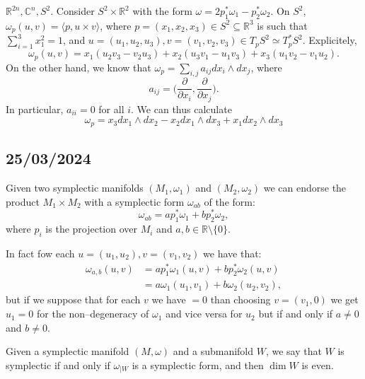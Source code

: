 \documentclass[misc]{subfiles}
\begin{document}
\begin{Exp}
    $\mathbb{R}^{2n}, \mathbb{C}^n, S^2$. Consider $S^2\times \mathbb{R}^2$ with the form $\omega = 2p_1^\ast\omega_1 - p_2^\ast\omega_2$. On $S^2$, $\omega_p(u,v) = \langle p, u\times v \rangle$, where $p=(x_1,x_2,x_3)\in S^2\subseteq \mathbb{R}^3$ is such that $\sum_{i=1}^3 x_1^2 = 1$, and $u=(u_1,u_2,u_3),v=(v_1,v_2,v_3)\in T_pS^2\simeq T_p^\ast S^2$. Explicitely,
    \[
    \omega_p(u,v) = x_1(u_2v_3 - v_2u_3) + x_2(u_3v_1 - u_1v_3) + x_3(u_1v_2 - v_1u_2).
    \] 
    On the other hand, we know that $\omega_p = \sum_{i,j} a_{ij} dx_i\wedge dx_j$, where
    \[
    a_{ij} = \bigg( \frac{\partial}{\partial x_i}, \frac{\partial}{\partial x_j}\bigg).
    \] 
    In particular, $a_{ii}=0$ for all $i$. We can thus calculate
    \[
    \omega_p = x_3dx_1\wedge dx_2 - x_2dx_1\wedge dx_3 + x_1dx_2\wedge dx_3 
    \] 
\end{Exp}


\subsection*{25/03/2024}

\begin{Rmk}
    Given two symplectic manifolds $(M_1,\omega_1)$ and $(M_2,\omega_2)$ we can endorse the product $M_1 \times M_2$ with a symplectic form $\omega_{ab}$ of the form:
    \[
    \omega_{ab}=ap^\ast_1\omega_1+bp^\ast_2\omega_2,
    \]
    where $p_i$ is the projection over $M_i$ and $a,b \in \mathbb{R} \setminus \{0\}$.

    In fact fow each $u=(u_1,u_2), v=(v_1,v_2)$ we have that:
    \begin{align*}
        \omega_{a,b}(u,v)   &= ap_1^\ast\omega_1(u,v) + bp_2^\ast\omega_2(u,v) \\
                            &= a\omega_1(u_1,v_1) + b\omega_2(u_2,v_2),
    \end{align*}
    but if we suppose that for each $v$ we have $=0$ than choosing $v=(v_1,0)$ we get $u_1=0$ for the non--degeneracy of $\omega_1$ and vice versa for $u_2$ but if and only if $a \neq 0$ and $b \neq 0$.
\end{Rmk}

\begin{Dfn}
    Given a symplectic manifold $(M,\omega)$ and a submanifold $W$, we say that $W$ is symplectic if and only if $\omega_{|W}$ is a symplectic form, and then $\dim W$ is even.
\end{Dfn}
\end{document}
